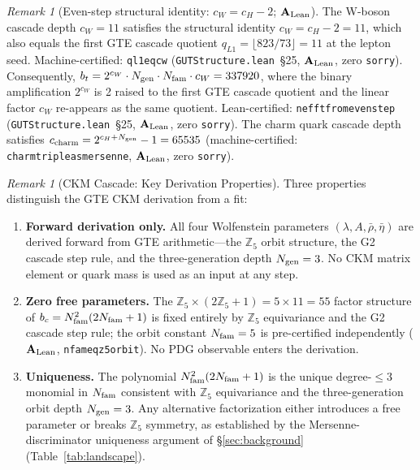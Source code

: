 \documentclass[11pt]{article}
\theoremstyle{remark}
\newtheorem{remark}[theorem]{Remark}
\newcommand{\Ngen}{N_{\rm gen}}
\newcommand{\Nfam}{N_{\rm fam}}
\newcommand{\cH}{c_H}
\newcommand{\lean}[1]{%
  \penalty-100
  \begingroup\def\_{\textunderscore\allowbreak}\texttt{#1}\endgroup}
\newcommand{\lam}{\lambda}
\newcommand{\Rbar}{\bar{\rho}}
\newcommand{\Ebar}{\bar{\eta}}
\newcommand{\bc}{b_c}
\newcommand{\bt}{b_t}
\newcommand{\CatAL}{\ensuremath{\textbf{A}_{\rm Lean}}}
\begin{document}
\begin{remark}[Even-step structural identity: $c_W = c_H - 2$; $\CatAL$]
\label{rem:cw_structure}
The W-boson cascade depth $c_W = 11$ satisfies the structural identity
$c_W = \cH - 2 = 11$, which also equals the first GTE cascade quotient
$q_{L1} = \lfloor 823/73 \rfloor = 11$ at the lepton seed.
Machine-certified: \lean{q\_l1\_eq\_c\_w} (\texttt{GUTStructure.lean}~\S25, $\CatAL$,
zero \texttt{sorry}).
Consequently, $\bt = 2^{c_W}\cdot\Ngen\cdot\Nfam\cdot c_W = 337920$, where the
binary amplification $2^{c_W}$ is 2 raised to the first GTE cascade quotient
and the linear factor $c_W$ re-appears as the same quotient.
Lean-certified: \lean{neff\_t\_from\_even\_step}
(\texttt{GUTStructure.lean}~\S25, $\CatAL$, zero \texttt{sorry}).
The charm quark cascade depth satisfies $c_{\rm charm} = 2^{\cH + \Ngen} - 1 = 65535$
(machine-certified: \lean{charm\_triple\_as\_mersenne}, $\CatAL$, zero \texttt{sorry}).
\end{remark}

\begin{remark}[CKM Cascade: Key Derivation Properties]
\label{rem:ckm_cascade_key_properties}
Three properties distinguish the GTE CKM derivation from a fit:
\begin{enumerate}
  \item \textbf{Forward derivation only.}
    All four Wolfenstein parameters $(\lam, A, \Rbar, \Ebar)$ are derived
    forward from GTE arithmetic---the $\mathbb{Z}_5$ orbit structure, the G2
    cascade step rule, and the three-generation depth $\Ngen = 3$.  No CKM
    matrix element or quark mass is used as an input at any step.
  \item \textbf{Zero free parameters.}
    The $\mathbb{Z}_5\!\times\!(2\mathbb{Z}_5+1) = 5\!\times\!11 = 55$
    factor structure of $\bc = \Nfam^2(2\Nfam+1)$ is fixed entirely by
    $\mathbb{Z}_5$ equivariance and the G2 cascade step rule; the orbit
    constant $\Nfam = 5$ is pre-certified independently ($\CatAL$,
    \lean{nfam\_eq\_z5\_orbit}).  No PDG observable enters the derivation.
  \item \textbf{Uniqueness.}
    The polynomial $\Nfam^2(2\Nfam+1)$ is the unique degree-$\leq 3$ monomial
    in $\Nfam$ consistent with $\mathbb{Z}_5$ equivariance and the
    three-generation orbit depth $\Ngen = 3$.  Any alternative factorization
    either introduces a free parameter or breaks $\mathbb{Z}_5$ symmetry,
    as established by the Mersenne-discriminator uniqueness argument of
    \S\ref{sec:background} (Table~\ref{tab:landscape}).
\end{enumerate}
\end{remark}
\end{document}
